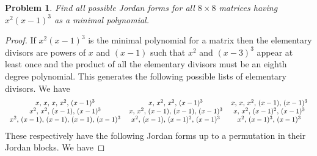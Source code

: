 \documentclass{article}
\newtheorem{problem}{Problem}
\begin{document}
\begin{problem}
Find all possible Jordan forms for all $8 \times 8$ matrices having $x^2(x-1)^3$ as a minimal polynomial.
\end{problem}
\begin{proof}
If $x^2(x-1)^3$ is the minimal polynomial for a matrix then the elementary divisors are powers of $x$ and $(x-1)$ such that $x^2$ and $(x-3)^3$ appear at least once and the product of all the elementary divisors must be an eighth degree polynomial. This generates the following possible lists of elementary divisors. We have
\[
\begin{tabular}{cccc}
$x$, $x$, $x$, $x^2$, $(x-1)^3$ & $x$, $x^2$, $x^2$, $(x-1)^3$ & $x$, $x$, $x^2$, $(x-1)$, $(x-1)^3$\\
$x^2$, $x^2$, $(x-1)$, $(x-1)^3$ & $x$, $x^2$, $(x-1)$, $(x-1)$, $(x-1)^3$ & $x$, $x^2$, $(x-1)^2$, $(x-1)^3$\\
$x^2$, $(x-1)$, $(x-1)$, $(x-1)$, $(x-1)^3$ & $x^2$, $(x-1)$, $(x-1)^2$, $(x-1)^3$ & $x^2$, $(x-1)^3$, $(x-1)^3$
\end{tabular}
\]
These respectively have the following Jordan forms up to a permutation in their Jordan blocks. We have
\end{proof}
\end{document}
